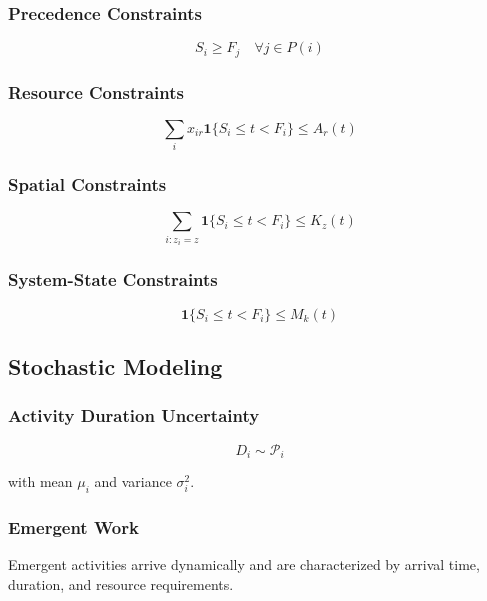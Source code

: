 \subsubsection{Precedence Constraints}
\begin{equation}
S_i \ge F_j \quad \forall j \in P(i)
\end{equation}

\subsubsection{Resource Constraints}
\begin{equation}
\sum_i x_{ir} \mathbf{1}\{S_i \le t < F_i\} \le A_r(t)
\end{equation}

\subsubsection{Spatial Constraints}
\begin{equation}
\sum_{i: z_i = z} \mathbf{1}\{S_i \le t < F_i\} \le K_z(t)
\end{equation}

\subsubsection{System-State Constraints}
\begin{equation}
\mathbf{1}\{S_i \le t < F_i\} \le M_k(t)
\end{equation}

\subsection{Stochastic Modeling}

\subsubsection{Activity Duration Uncertainty}
\begin{equation}
D_i \sim \mathcal{P}_i
\end{equation}

with mean $\mu_i$ and variance $\sigma_i^2$.

\subsubsection{Emergent Work}
Emergent activities arrive dynamically and are characterized by arrival time, duration, and resource requirements.

